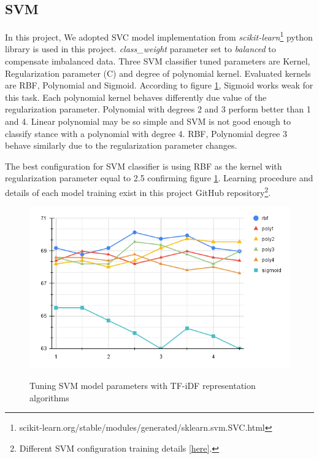 \subsection{SVM}
In this project, We adopted SVC model implementation from \textit{scikit-learn}\footnote{scikit-learn.org/stable/modules/generated/sklearn.svm.SVC.html} python library is used in this project. \textit{class\_weight} parameter set to \textit{balanced} to compensate imbalanced data. Three SVM classifier tuned parameters  are Kernel, Regularization parameter (C) and degree of polynomial kernel. Evaluated kernels are RBF, Polynomial and Sigmoid. According to figure \ref{fig:svm}, Sigmoid works weak for this task. Each polynomial kernel behaves differently due value of the regularization parameter. Polynomial with degrees 2 and 3 perform better than 1 and 4. Linear polynomial may be so simple and SVM is not good enough to classify stance with a polynomial with degree 4. RBF, Polynomial degree 3 behave similarly due to the regularization parameter changes. 

The best configuration for SVM classifier is using RBF as the kernel with regularization parameter equal to 2.5 confirming figure \ref{fig:svm}. Learning procedure and details of each model training exist in this project GitHub repository\footnote{Different SVM configuration training details \href{https://github.com/mahsaghn/stance\_detection/tree/main/selected\_outputs/machinelearning/svm}{[here]}.}.

\begin{figure}%
	\centering
	{\includegraphics[width=12.5cm]{statistics/svm.png} }
	\caption{Tuning SVM model parameters with TF-iDF representation algorithms}%
	\label{fig:svm}%
\end{figure}

